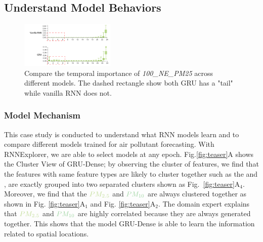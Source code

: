\subsection{Understand Model Behaviors}
\begin{figure}[t]
	\centering
	\includegraphics[width=0.40\textwidth]{pictures/Evaluation/FI_comparison.pdf}
	\vspace{-3mm}
	\caption{Compare the temporal importance of \textit{100\_NE\_PM25}  across different models. The dashed rectangle show both GRU has a "tail" while vanilla RNN does not.}
	\label{fig:gru_vs_rnn}
	\vspace{-4mm}
\end{figure}

\subsubsection{Model Mechanism}
This case study is conducted to understand what RNN models learn and to compare different models trained for air pollutant forecasting. 
With RNNExplorer, we are able to select models at any epoch. Fig.\ref{fig:teaser}A shows the Cluster View of GRU-Dense; by observing the cluster of features, we find that the features with same feature types are likely to cluster together such as the \textit{\color{RHColor}{Relative Humidity}} and \textit{\color{DPColor}{Dew-point}}, are exactly grouped into two separated clusters shown as Fig.~\ref{fig:teaser}A$_4$.
Moreover, we find that the $\color{PM25Color}{PM_{2.5}}$ and $\color{PM10Color}{PM_{10}}$ are always clustered together as shown in Fig. \ref{fig:teaser}A$_1$ and Fig. \ref{fig:teaser}A$_2$.
The domain expert explains that $\color{PM25Color}{PM_{2.5}}$ and $\color{PM10Color}{PM_{10}}$ are highly correlated because they are always generated together.
This  shows that the model GRU-Dense is able to learn the information related to spatial locations.  

